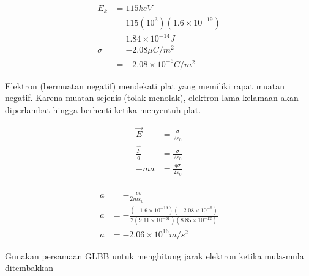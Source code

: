 \begin{enumerate}
    \begin{minipage}{0.5\textwidth}
    \begin{center}
    \end{center}
    \end{minipage}
    \hfill
    \begin{minipage}{0.4\textwidth}
    \begin{align*}
        E_{k}&=115keV\\
            &= 115(10^{3})(1.6\times10^{-19})\\
            &= 1.84\times 10^{-14}J\\
        \sigma&=-2.08\mu C/m^{2}\\
        &= -2.08\times 10^{-6}C/m^{2}
    \end{align*}
    \end{minipage}
    \vskip5pt
    Elektron (bermuatan negatif) mendekati plat yang memiliki rapat muatan negatif. Karena muatan sejenis (tolak menolak), elektron lama kelamaan akan diperlambat hingga berhenti ketika menyentuh plat. 

    \begin{minipage}{0.4\textwidth}
    \begin{align*}
        \vec{E}&=\frac{\sigma}{2\varepsilon_{0}}\\
        \frac{\vec{F}}{q}&=\frac{\sigma}{2\varepsilon_{0}}\\
        -ma&=\frac{q\sigma}{2\varepsilon_{0}}\\  
    \end{align*}
    \end{minipage}
    \hfill
    \begin{minipage}{0.5\textwidth}
    \begin{align*}
        a&=-\frac{-e\sigma}{2m\varepsilon_{0}}\\
        a&= -\frac{(-1.6\times10^{-19})(-2.08\times 10^{-6})}{2(9.11\times10^{-31})(8.85\times10^{-12})}\\
        a &= -2.06\times10^{16}m/s^{2}
    \end{align*}
    \end{minipage}
    Gunakan persamaan GLBB untuk menghitung jarak elektron ketika mula-mula ditembakkan
    

\end{enumerate}
